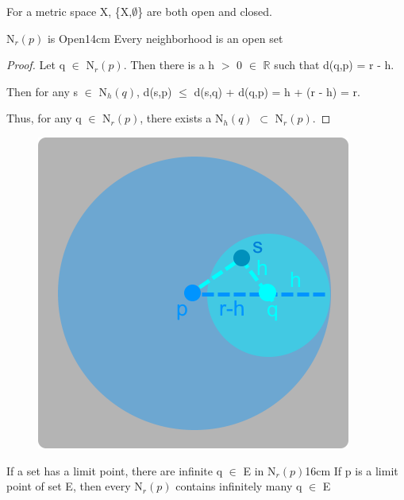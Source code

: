 	\hspace{0.7cm}
	For a metric space X, \{X,$\emptyset$\} are both open and closed.

	\vspace{0.5cm}



	\begin{wtheorem}{N$_r(p)$ is Open}{14cm}
		Every neighborhood is an open set
	\end{wtheorem}
	
	\begin{proof}
		Let q $\in$ N$_r(p)$. Then there is a h $>$ 0 $\in$ $\mathbb{R}$
		such that d(q,p) = r - h.

		Then for any s $\in$ N$_h(q)$,
		d(s,p) $\leq$  d(s,q) + d(q,p) = h + (r - h) = r.

		Thus, for any q $\in$ N$_r(p)$, there exists a N$_h(q)$ $\subset$ N$_r(p)$.
	\end{proof}



	\begin{figure}[h]
		\centering
		\includegraphics[scale=0.34]{Images/5.1.3.png}
	\end{figure}

	\newpage



	\begin{wtheorem}{If a set has a limit point, there are infinite q
	$\in$ E in N$_r(p)$}{16cm}
		If p is a limit point of set E, then every N$_r(p)$
		contains infinitely many q $\in$ E
	\end{wtheorem}
	
